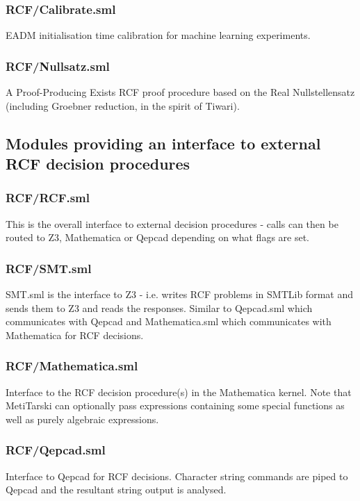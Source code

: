 \documentclass[11pt, oneside]{article}   	%
\begin{document}
\subsubsection{RCF/Calibrate.sml}
EADM initialisation time calibration for machine learning experiments.  

\subsubsection{RCF/Nullsatz.sml}
A Proof-Producing Exists RCF proof procedure based on the Real Nullstellensatz  (including Groebner reduction, in the spirit of Tiwari).

\subsection{Modules providing an interface to external RCF decision procedures}


\subsubsection{RCF/RCF.sml}
This is the overall interface to external decision procedures - calls can then be routed to Z3, Mathematica or Qepcad depending on what flags are set.

 \subsubsection{RCF/SMT.sml}
 SMT.sml is the interface to Z3 - i.e. writes RCF problems in SMTLib format and sends them to Z3 and reads the responses. Similar to Qepcad.sml which communicates
 with Qepcad and Mathematica.sml which communicates with Mathematica for RCF decisions.
 
\subsubsection{RCF/Mathematica.sml}
Interface to the RCF decision procedure(s) in the Mathematica kernel. Note that MetiTarski can optionally pass expressions containing some special functions as well as purely
algebraic expressions.

\subsubsection{RCF/Qepcad.sml}
Interface to Qepcad for RCF decisions. Character string commands are piped to Qepcad and the resultant string output is analysed.
\end{document}
